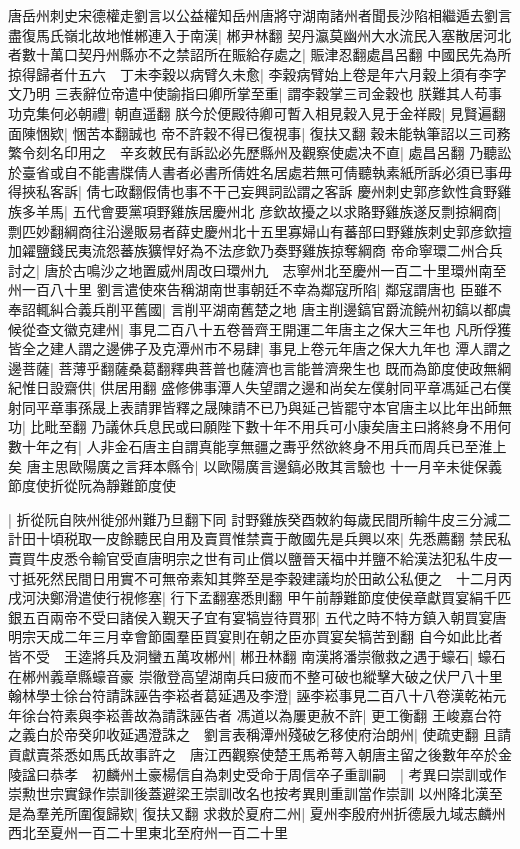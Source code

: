唐岳州刺史宋德權走劉言以公益權知岳州唐將守湖南諸州者聞長沙陷相繼遁去劉言盡復馬氏嶺北故地惟郴連入于南漢|{
	郴尹林翻}
契丹瀛莫幽州大水流民入塞散居河北者數十萬口契丹州縣亦不之禁詔所在賑給存處之|{
	賑津忍翻處昌呂翻}
中國民先為所掠得歸者什五六　丁未李穀以病臂久未愈|{
	李穀病臂始上卷是年六月穀上須有李字文乃明}
三表辭位帝遣中使諭指曰卿所掌至重|{
	謂李穀掌三司金穀也}
朕難其人苟事功克集何必朝禮|{
	朝直遥翻}
朕今於便殿待卿可暫入相見穀入見于金祥殿|{
	見賢遍翻}
面陳悃欵|{
	悃苦本翻誠也}
帝不許穀不得已復視事|{
	復扶又翻}
穀未能執筆詔以三司務繁令刻名印用之　辛亥敇民有訴訟必先歷縣州及觀察使處决不直|{
	處昌呂翻}
乃聽訟於臺省或自不能書牒倩人書者必書所倩姓名居處若無可倩聽執素紙所訴必須已事毋得挾私客訴|{
	倩七政翻假倩也事不干己妄興詞訟謂之客訴}
慶州刺史郭彦欽性貪野雞族多羊馬|{
	五代會要黨項野雞族居慶州北}
彦欽故擾之以求賂野雞族遂反剽掠綱商|{
	剽匹妙翻綱商往沿邊販易者薛史慶州北十五里寡婦山有蕃部曰野雞族刺史郭彦欽擅加糴鹽錢民夷流怨蕃族獷悍好為不法彦欽乃奏野雞族掠奪綱商}
帝命寧環二州合兵討之|{
	唐於古鳴沙之地置威州周改曰環州九　志寧州北至慶州一百二十里環州南至　州一百八十里}
劉言遣使來告稱湖南世事朝廷不幸為鄰寇所陷|{
	鄰寇謂唐也}
臣雖不奉詔輒糾合義兵削平舊國|{
	言削平湖南舊楚之地}
唐主削邊鎬官爵流饒州初鎬以都虞候從查文徽克建州|{
	事見二百八十五卷晉齊王開運二年唐主之保大三年也}
凡所俘獲皆全之建人謂之邊佛子及克潭州市不易肆|{
	事見上卷元年唐之保大九年也}
潭人謂之邊菩薩|{
	菩薄乎翻薩桑葛翻釋典菩普也薩濟也言能普濟衆生也}
既而為節度使政無綱紀惟日設齋供|{
	供居用翻}
盛修佛事潭人失望謂之邊和尚矣左僕射同平章馮延己右僕射同平章事孫晟上表請罪皆釋之晟陳請不已乃與延己皆罷守本官唐主以比年出師無功|{
	比毗至翻}
乃議休兵息民或曰願陛下數十年不用兵可小康矣唐主曰將終身不用何數十年之有|{
	人非金石唐主自謂真能享無疆之夀乎然欲終身不用兵而周兵已至淮上矣}
唐主思歐陽廣之言拜本縣令|{
	以歐陽廣言邊鎬必敗其言驗也}
十一月辛未徙保義節度使折從阮為靜難節度使

|{
	折從阮自陜州徙邠州難乃旦翻下同}
討野雞族癸酉敇約每歲民間所輸牛皮三分減二計田十頃税取一皮餘聽民自用及賣買惟禁賣于敵國先是兵興以來|{
	先悉薦翻}
禁民私賣買牛皮悉令輸官受直唐明宗之世有司止償以鹽晉天福中并鹽不給漢法犯私牛皮一寸抵死然民間日用實不可無帝素知其弊至是李穀建議均於田畝公私便之　十二月丙戌河決鄭滑遣使行視修塞|{
	行下孟翻塞悉則翻}
甲午前靜難節度使侯章獻買宴絹千匹銀五百兩帝不受曰諸侯入覲天子宜有宴犒豈待買邪|{
	五代之時不特方鎮入朝買宴唐明宗天成二年三月幸會節園羣臣買宴則在朝之臣亦買宴矣犒苦到翻}
自今如此比者皆不受　王逵將兵及洞蠻五萬攻郴州|{
	郴丑林翻}
南漢將潘崇徹救之遇于蠔石|{
	蠔石在郴州義章縣蠔音豪}
崇徹登高望湖南兵曰疲而不整可破也縱擊大破之伏尸八十里　翰林學士徐台符請誅誣告李崧者葛延遇及李澄|{
	誣李崧事見二百八十八卷漢乾祐元年徐台符素與李崧善故為請誅誣告者}
馮道以為屢更赦不許|{
	更工衡翻}
王峻嘉台符之義白於帝癸卯收延遇澄誅之　劉言表稱潭州殘破乞移使府治朗州|{
	使疏吏翻}
且請貢獻賣茶悉如馬氏故事許之　唐江西觀察使楚王馬希萼入朝唐主留之後數年卒於金陵諡曰恭孝　初麟州土豪楊信自為刺史受命于周信卒子重訓嗣　|{
	考異曰崇訓或作崇勲世宗實録作崇訓後蓋避梁王崇訓改名也按考異則重訓當作崇訓}
以州降北漢至是為羣羌所圍復歸欵|{
	復扶又翻}
求救於夏府二州|{
	夏州李殷府州折德扆九域志麟州西北至夏州一百二十里東北至府州一百二十里}


